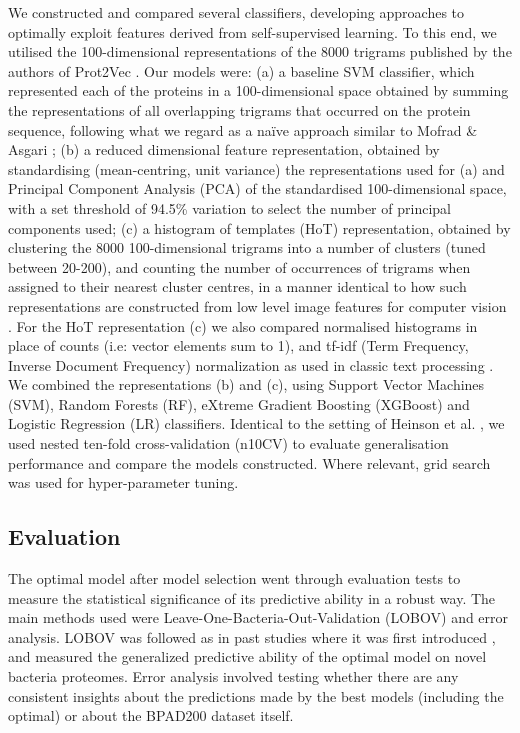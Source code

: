 \documentclass[10pt,journal,compsoc,twoside]{IEEEtran}
\begin{document}
We constructed and compared several classifiers, developing approaches to optimally exploit features derived from self-supervised learning. To this end, we utilised the 100-dimensional representations of the 8000 trigrams published by the authors of Prot2Vec \cite{protvec}. Our models were: (a) a baseline SVM classifier, which represented each of the proteins in a 100-dimensional space obtained by summing the representations of all overlapping trigrams that occurred on the protein sequence, following what we regard as a naïve approach similar to Mofrad & Asgari \cite{protvec}; (b) a reduced dimensional feature representation, obtained by standardising (mean-centring, unit variance) the representations used for (a) and Principal Component Analysis (PCA) of the standardised 100-dimensional space, with a set threshold of 94.5\% variation to select the number of principal components used; (c) a histogram of templates (HoT) representation, obtained by clustering the 8000 100-dimensional trigrams into a number of clusters (tuned between 20-200), and counting the number of occurrences of trigrams when assigned to their nearest cluster centres, in a manner identical to how such representations are constructed from low level image features for computer vision \cite{bovw-computer-vision}. For the HoT representation (c) we also compared normalised histograms in place of counts (i.e: vector elements sum to 1), and tf-idf (Term Frequency, Inverse Document Frequency) normalization as used in classic text processing \cite{tf-idf}. We combined the representations (b) and (c), using Support Vector Machines (SVM), Random Forests (RF), eXtreme Gradient Boosting (XGBoost) and Logistic Regression (LR) classifiers. Identical to the setting of Heinson et al. \cite{heinson_2017}, we used nested ten-fold cross-validation (n10CV) to evaluate generalisation performance and compare the models constructed. Where relevant, grid search was used for hyper-parameter tuning. 


\subsection{Evaluation}
\label{sec:methods3}

The optimal model after model selection went through evaluation tests to measure the statistical significance of its predictive ability in a robust way. The main methods used were Leave-One-Bacteria-Out-Validation (LOBOV) and error analysis. LOBOV was followed as in past studies where it was first introduced \cite{heinson_2019}, and measured the generalized predictive ability of the optimal model on novel bacteria proteomes. Error analysis involved testing whether there are any consistent insights about the predictions made by the best models (including the optimal) or about the BPAD200 dataset itself.
\end{document}

